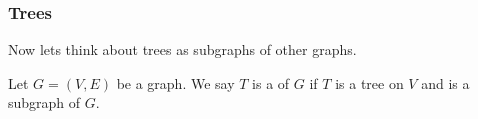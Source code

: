 \documentclass[11pt, mathserif]{beamer}
\theoremstyle{definition}
\theoremstyle{remark}
\begin{document}
\begin{frame}
  \frametitle{Trees}

  Now lets think about trees as subgraphs of other graphs.

  \begin{definition}
    Let $G = (V, E)$ be a graph. We say $T$ is a  of $G$ if $T$ is a tree on $V$ and is a subgraph of $G$.
  \end{definition}

  \vspace{2\baselineskip}

  \begin{center}
	

    
    \begin{tikzpicture}[x=0.75pt,y=0.75pt,yscale=-1,xscale=1]
    

\end{tikzpicture}
\end{center}
\end{frame}
\end{document}
